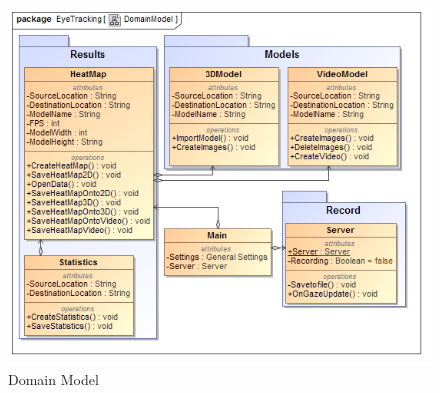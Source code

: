 	\begin{figure}[!ht]
		\centering
		\includegraphics[scale=0.5, width=15cm, keepaspectratio]{Diagrams/Class_Diagram__DomainModel.png}
		\caption{Domain Model}
		\label{Domain Model}
	\end{figure}